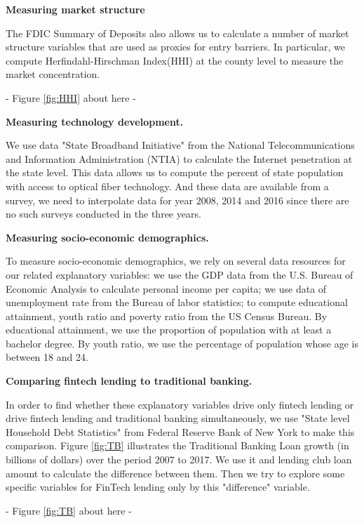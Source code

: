\documentclass[11pt, a4paper, leqno]{article}
\begin{document}
\textbf{Measuring market structure}

The FDIC Summary of Deposits also allows us to calculate a number of market structure variables that are used as proxies for entry barriers. In particular, we compute Herfindahl-Hirschman Index(HHI) at the county level to measure the market concentration.

\begin{center}
- Figure \ref{fig:HHI} about here -
\end{center}

\textbf{Measuring technology development.} 

We use data "State Broadband Initiative" from the National Telecommunications and Information Administration (NTIA) to calculate the Internet penetration at the state level. 
This data allows us to compute the percent of state population with access to optical fiber technology. And these data are available from a survey, we need to interpolate data for year 2008, 2014 and 2016 since there are no such surveys conducted in the three years.

\textbf{Measuring socio-economic demographics.} 

To measure socio-economic demographics, we rely on several data resources for our related explanatory variables: we use the GDP data from the U.S. Bureau of Economic Analysis to calculate personal income per capita; we use data of unemployment rate from the Bureau of labor statistics; to compute educational attainment, youth ratio and poverty ratio from the US Census Bureau. By educational attainment, we use the proportion of population with at least a bachelor degree. By youth ratio, we use the percentage of population whose age is between 18 and 24.

\textbf{Comparing fintech lending to traditional banking.}

In order to find whether these explanatory variables drive only fintech lending or drive fintech lending and traditional banking simultaneously, we use "State­ level Household Debt Statistics" from Federal Reserve Bank of New York to make this comparison. 
Figure \ref{fig:TB} illustrates the Traditional Banking Loan growth (in billions of dollars) over the period 2007 to 2017. We use it and lending club loan amount to calculate the difference between them. Then we try to explore some specific variables for FinTech lending only by this "difference" variable.

\begin{center}
- Figure \ref{fig:TB} about here -
\end{center}
\end{document}
